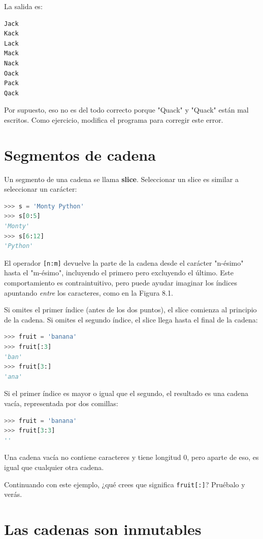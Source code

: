 La salida es:

\begin{lstlisting}[language=Python]
Jack
Kack
Lack
Mack
Nack
Oack
Pack
Qack
\end{lstlisting}

Por supuesto, eso no es del todo correcto porque "Quack" y "Quack" están mal escritos. Como ejercicio, modifica el programa para corregir este error.

\section{Segmentos de cadena}

Un segmento de una cadena se llama \textbf{slice}. Seleccionar un slice es similar a seleccionar un carácter:

\begin{lstlisting}[language=Python]
>>> s = 'Monty Python'
>>> s[0:5]
'Monty'
>>> s[6:12]
'Python'
\end{lstlisting}

El operador \texttt{[n:m]} devuelve la parte de la cadena desde el carácter "n-ésimo" hasta el "m-ésimo", incluyendo el primero pero excluyendo el último. Este comportamiento es contraintuitivo, pero puede ayudar imaginar los índices apuntando \textit{entre} los caracteres, como en la Figura 8.1.

Si omites el primer índice (antes de los dos puntos), el slice comienza al principio de la cadena. Si omites el segundo índice, el slice llega hasta el final de la cadena:

\begin{lstlisting}[language=Python]
>>> fruit = 'banana'
>>> fruit[:3]
'ban'
>>> fruit[3:]
'ana'
\end{lstlisting}

Si el primer índice es mayor o igual que el segundo, el resultado es una cadena vacía, representada por dos comillas:

\begin{lstlisting}[language=Python]
>>> fruit = 'banana'
>>> fruit[3:3]
''
\end{lstlisting}

Una cadena vacía no contiene caracteres y tiene longitud 0, pero aparte de eso, es igual que cualquier otra cadena.

Continuando con este ejemplo, ¿qué crees que significa \texttt{fruit[:]}? Pruébalo y verás.

\section{Las cadenas son inmutables}

